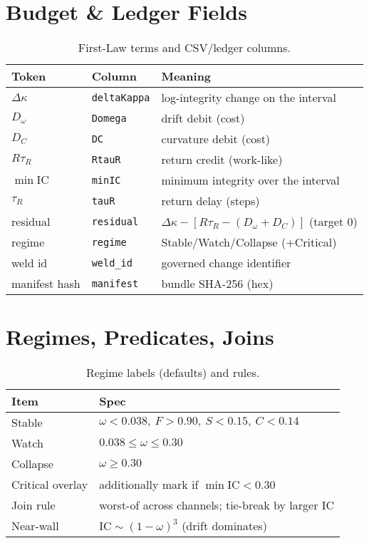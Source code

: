 \section{Budget \& Ledger Fields}
\label{sec:glossary-budget}
\begin{table}[H]
  \centering
  \caption{First-Law terms and CSV/ledger columns.}
  \label{tab:glossary-budget}
  \footnotesize
  \begingroup\setlength{\tabcolsep}{6pt}
  \begin{tabularx}{\linewidth}{@{} l l >{\raggedright\arraybackslash}X @{}}
    \toprule
    Token & Column & Meaning \\
    \midrule
    $\Delta\kappa$ & \texttt{deltaKappa} & log-integrity change on the interval \\
    $D_{\omega}$   & \texttt{Domega}     & drift debit (cost) \\
    $D_{C}$        & \texttt{DC}         & curvature debit (cost) \\
    $R\tau_{R}$    & \texttt{RtauR}      & return credit (work-like) \\
    $\min\mathrm{IC}$ & \texttt{minIC}   & minimum integrity over the interval \\
    $\tau_{R}$     & \texttt{tauR}       & return delay (steps) \\
    residual       & \texttt{residual}   & $\Delta\kappa - [R\tau_R-(D_\omega+D_C)]$ (target $0$) \\
    regime         & \texttt{regime}     & Stable/Watch/Collapse (+Critical) \\
    weld id        & \texttt{weld\_id}   & governed change identifier \\
    manifest hash  & \texttt{manifest}   & bundle SHA-256 (hex) \\
    \bottomrule
  \end{tabularx}
  \endgroup
\end{table}

\section{Regimes, Predicates, Joins}
\label{sec:glossary-regimes}
\begin{table}[H]
  \centering
  \caption{Regime labels (defaults) and rules.}
  \label{tab:glossary-regimes}
  \footnotesize
  \begingroup\setlength{\tabcolsep}{6pt}
  \begin{tabularx}{\linewidth}{@{} l >{\raggedright\arraybackslash}X @{}}
    \toprule
    Item & Spec \\
    \midrule
    Stable   & $\omega<0.038,\ F>0.90,\ S<0.15,\ C<0.14$ \\
    Watch    & $0.038\le \omega \le 0.30$ \\
    Collapse & $\omega\ge 0.30$ \\
    Critical overlay & additionally mark if $\min\mathrm{IC}<0.30$ \\
    Join rule & worst-of across channels; tie-break by larger $\mathrm{IC}$ \\
    Near-wall & $\mathrm{IC}\sim(1-\omega)^3$ (drift dominates) \\
    \bottomrule
  \end{tabularx}
  \endgroup
\end{table}

